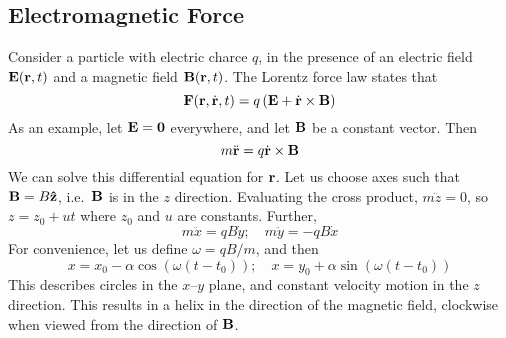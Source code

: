\subsection{Electromagnetic Force}
Consider a particle with electric charce \(q\), in the presence of an electric field \(\vb E(\vb r, t)\) and a magnetic field \(\vb B(\vb r, t)\). The Lorentz force law states that
\[ \vb F(\vb r, \dot{\vb r}, t) = q\left( \vb E + \dot{\vb r} \times \vb B \right) \]
As an example, let \(\vb E = \vb 0\) everywhere, and let \(\vb B\) be a constant vector. Then
\[ m \ddot{\vb r} = q \dot{\vb r} \times \vb B \]
We can solve this differential equation for \(\vb r\). Let us choose axes such that \(\vb B = B \vu{z}\), i.e.\ \(\vb B\) is in the \(z\) direction. Evaluating the cross product, \(m \ddot{z} = 0\), so \(z = z_0 + ut\) where \(z_0\) and \(u\) are constants. Further,
\[ m \ddot x = qB\dot y;\quad m \ddot y = -qB\dot x \]
For convenience, let us define \(\omega = qB/m\), and then
\[ x = x_0 - \alpha \cos(\omega(t - t_0));\quad x = y_0 + \alpha \sin(\omega(t - t_0)) \]
This describes circles in the \(x\)--\(y\) plane, and constant velocity motion in the \(z\) direction. This results in a helix in the direction of the magnetic field, clockwise when viewed from the direction of \(\vb B\).

